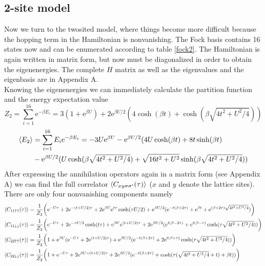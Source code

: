 \subsection{2-site model}
Now we turn to the twosited model, where things become more difficult because the hopping term in the Hamiltonian is nonvanishing. The Fock basis contains 16 states now and can be enumerated according to table \ref{fock2}. The Hamiltonian is again written in matrix form, but now must be diagonalized in order to obtain the eigenenergies. The complete $H$ matrix as well as the eigenvalues and the eigenbasis are in Appendix A. \\
Knowing the eigenenergies we can immediately calculate the partition function and the energy expectation value
\begin{equation}
	Z_2=\sum_{i=1}^{16}\text{e}^{-\beta E_i}= 3(1+\text{e}^{\beta U})+2\text{e}^{\beta U/2}(4\cosh(\beta t)+\cosh(\beta\sqrt{4t^2+U^2/4}))
\end{equation}
\begin{align}
	\braket{E_2}&= \sum_{i=1}^{16}E_i\text{e}^{-\beta E_i} = -3U\text{e}^{\beta U}-\text{e}^{\beta U/2}(4U\cosh(\beta t)+8t\sinh(\beta t)\\&-\text{e}^{\beta U/2}(U\cosh(\beta\sqrt{4t^2+U^2/4})+\sqrt{16t^2+U^2}\sinh(\beta\sqrt{4t^2+U^2/4}))\nonumber
\end{align}
After expressing the annihilation operators again in a matrix form (see Appendix A) we can find the full correlator $\braket{C_{xy\sigma\sigma^{\prime}}(\tau)}$ ($x$ and $y$ denote the lattice sites). There are only four nonvanishing components namely
\begin{align*}
	\braket{C_{11\uparrow\uparrow}(\tau)}&= \frac{1}{Z_2}\biggl(\text{e}^{-U\tau}+2\text{e}^{-(t+U/2)\tau}+2\text{e}^{\beta U}\text{e}^{t\tau}\cosh(\tau U/2)+\text{e}^{\beta U/2}(\text{e}^{-t(\beta+2\tau)}+\text{e}^{\beta t}+\text{e}^{(\beta+2\tau)\sqrt{4t^2+U^2/4}})\biggr)\\
	\braket{C_{11\downarrow\downarrow}(\tau)}&= \frac{1}{Z_2}\biggl(\text{e}^{-U\tau}+2\text{e}^{-\tau U/2}\cosh(t\tau)+\text{e}^{\beta U}\text{e}^{(t+U/2)\tau}+2\text{e}^{\beta U/2}(\text{e}^{t(\beta-2\tau)}+\text{e}^{t(\beta-\tau) }\cosh(\tau\sqrt{4t^2+U^2/4}))\biggr)\\
	\braket{C_{22\uparrow\uparrow}(\tau)}&= \frac{1}{Z_2}\biggl(1+\text{e}^{\beta U}(\text{e}^{-U\tau}+2\text{e}^{(t+U/2)\tau})+\text{e}^{\beta U/2}(\text{e}^{-t(\beta+2\tau)}+2\text{e}^{t(\beta+\tau) }\cosh(\tau\sqrt{4t^2+U^2/4}))\biggr)\\
	\braket{C_{22\downarrow\downarrow}(\tau)}&= \frac{1}{Z_2}\biggl(1+\text{e}^{-U\tau}+2\text{e}^{\beta U+(t+U/2)\tau}+2\text{e}^{\beta U/2}(\text{e}^{-t(\beta+2\tau)}+\cosh(\tau(\sqrt{4t^2+U^2/4}+t)+\beta t))\biggr)
\end{align*}

